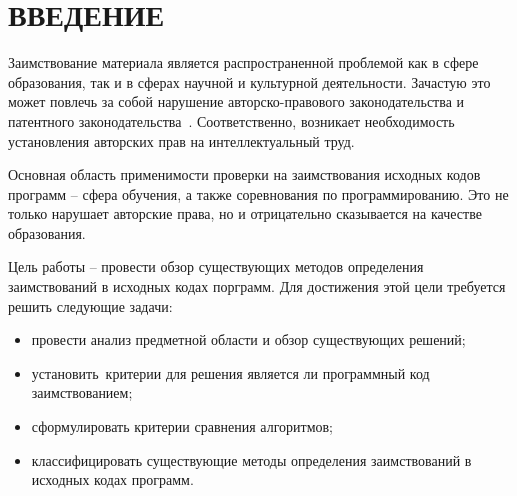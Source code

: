 \section*{ВВЕДЕНИЕ}

Заимствование материала является распространенной проблемой как в сфере образования, так и в сферах научной и культурной деятельности. Зачастую это может повлечь за собой нарушение авторско-правового законодательства и патентного законодательства~\cite{law}. Соответственно, возникает необходимость установления авторских прав на интеллектуальный труд.

Основная область применимости проверки на заимствования исходных кодов программ -- сфера обучения, а также соревнования по программированию. Это не только нарушает авторские права, но и отрицательно сказывается на качестве образования.

Цель работы -- провести обзор существующих методов определения заимствований в исходных кодах порграмм.
Для достижения этой цели требуется решить следующие задачи:
\begin{itemize}[label*=---]
	\item провести анализ предметной области и обзор существующих решений;
	\item установить критерии для решения является ли программный код заимствованием;
	\item сформулировать критерии сравнения алгоритмов;
	\item классифицировать существующие методы определения заимствований в исходных кодах программ.
\end{itemize}

\pagebreak
